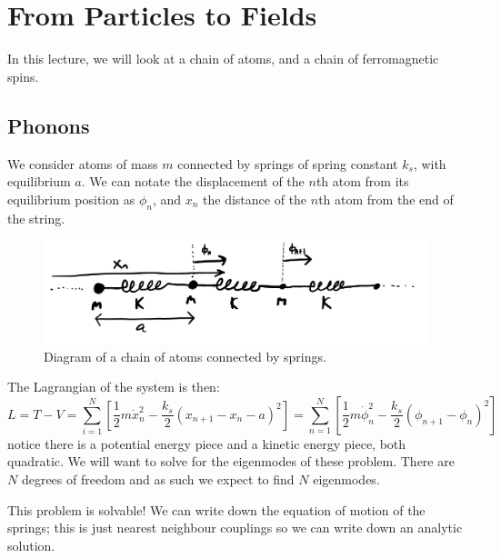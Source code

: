 \section{From Particles to Fields}
In this lecture, we will look at a chain of atoms, and a chain of ferromagnetic spins.

\subsection{Phonons}

We consider atoms of mass $m$ connected by springs of spring constant $k_s$, with equilibrium $a$. We can notate the displacement of the $n$th atom from its equilibrium position as $\phi_n$, and $x_n$ the distance of the $n$th atom from the end of the string. 

\begin{figure}[htbp]
    \centering
    \includegraphics[scale=0.4]{Lectures/Figures/Atom_spring_chain.png}
    \caption{Diagram of a chain of atoms connected by springs.}
    \label{fig:Atom_spring_chain}
\end{figure}

The Lagrangian of the system is then:
\begin{equation}
    L = T - V = \sum_{i=1}^N \left[\frac{1}{2}m\dot{x}_n^2 - \frac{k_s}{2}\left(x_{n+1} - x_n - a\right)^2\right] = \sum_{n=1}^N \left[\frac{1}{2}m\dot{\phi}_n^2 - \frac{k_s}{2}\left(\phi_{n+1}-\phi_n\right)^2\right]
\end{equation}
notice there is a potential energy piece and a kinetic energy piece, both quadratic. We will want to solve for the eigenmodes of these problem. There are $N$ degrees of freedom and as such we expect to find $N$ eigenmodes.

This problem is solvable! We can write down the equation of motion of the springs; this is just nearest neighbour couplings so we can write down an analytic solution.

